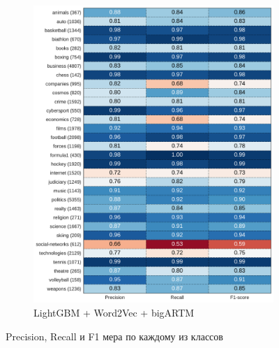\documentclass[a4paper, 14pt]{extarticle}
\begin{document}
\begin{figure}[t!]
\begin{subfigure}[t]{0.5\textwidth}
		\includegraphics[width=1\textwidth]{lgb_w2v_bigartm_classif_report.pdf}
		\caption{LightGBM + Word2Vec + bigARTM}
	\end{subfigure}
	\caption{Precision, Recall и F1 мера по каждому из классов}
	\label{lgb_vs_svm}
\end{figure}
\end{document}
